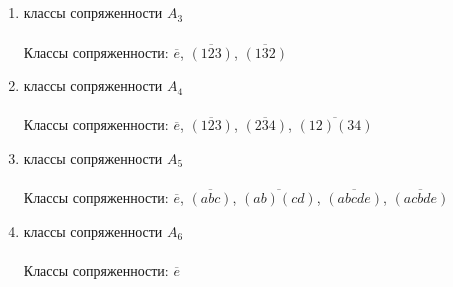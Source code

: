 		\subsection{}
		\begin{enumerate}
			\item классы сопряженности $A_3$\\
				\\
				Классы сопряженности: $\overline{e}$, $\overline{(123)}$, $\overline{(132)}$\\
				
			\item классы сопряженности $A_4$\\
				\\
				Классы сопряженности: $\overline{e}$, $\overline{(123)}$, $\overline{(234)}$, $\overline{(12)(34)}$\\
				
			\item классы сопряженности $A_5$\\
				\\
				Классы сопряженности: $\overline{e}$, $\overline{(abc)}$, $\overline{(ab)(cd)}$, $\overline{(abcde)}$, $\overline{(acbde)}$\\
				
			\item классы сопряженности $A_6$\\
				\\
				Классы сопряженности: $\overline{e}$\\
				
		\end{enumerate}
		
		\subsection{}
		

